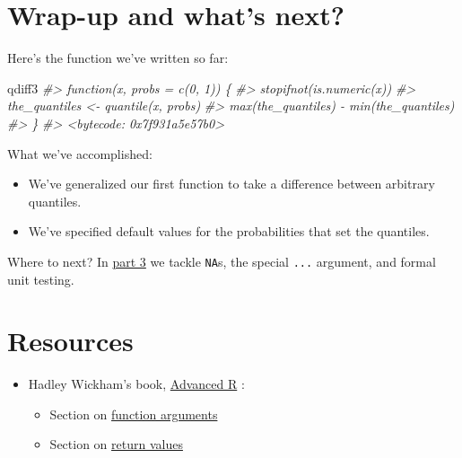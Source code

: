 \documentclass[
]{book}
\newenvironment{Shaded}{\begin{snugshade}}{\end{snugshade}}
\newcommand{\CommentTok}[1]{\textcolor[rgb]{0.56,0.35,0.01}{\textit{#1}}}
\newcommand{\NormalTok}[1]{#1}
\providecommand{\tightlist}{%
  \setlength{\itemsep}{0pt}\setlength{\parskip}{0pt}}
\begin{document}
\hypertarget{wrap-up-and-whats-next}{%
\section{Wrap-up and what's next?}\label{wrap-up-and-whats-next}}

Here's the function we've written so far:

\begin{Shaded}
\begin{Highlighting}[]
\NormalTok{qdiff3}
\CommentTok{#> function(x, probs = c(0, 1)) \{}
\CommentTok{#>   stopifnot(is.numeric(x))}
\CommentTok{#>   the_quantiles <- quantile(x, probs)}
\CommentTok{#>   max(the_quantiles) - min(the_quantiles)}
\CommentTok{#> \}}
\CommentTok{#> <bytecode: 0x7f931a5e57b0>}
\end{Highlighting}
\end{Shaded}

What we've accomplished:

\begin{itemize}
\tightlist
\item
  We've generalized our first function to take a difference between arbitrary quantiles.
\item
  We've specified default values for the probabilities that set the quantiles.
\end{itemize}

Where to next? In \protect\hyperlink{functions-part3}{part 3} we tackle \texttt{NA}s, the special \texttt{...} argument, and formal unit testing.

\hypertarget{resources}{%
\section{Resources}\label{resources}}

\begin{itemize}
\tightlist
\item
  Hadley Wickham's book, \href{http://adv-r.had.co.nz}{Advanced R} \citeyearpar{wickham2015a}:

  \begin{itemize}
  \tightlist
  \item
    Section on \href{http://adv-r.had.co.nz/Functions.html\#function-arguments}{function arguments}
  \item
    Section on \href{http://adv-r.had.co.nz/Functions.html\#return-values}{return values}
  \end{itemize}
\end{itemize}

  
\end{document}
